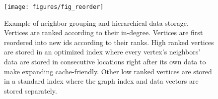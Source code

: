 
\begin{figure}
    \centering
    \texttt{[image: figures/fig\_reorder]}
    \caption{Example of neighbor grouping and hierarchical data storage. 
            \textmd{
                    Vertices are ranked according to their in-degree. 
                 Vertices are first reordered into new ids according to their ranks.
                    High ranked vertices are stored in an optimized index where every vertex's neighbors' data are stored in consecutive locations right after its own data to make expanding cache-friendly. 
                    Other low ranked vertices are stored in a standard index where the graph index and data vectors are stored separately.}}
    \label{fig:fig_reorder}
\end{figure}

